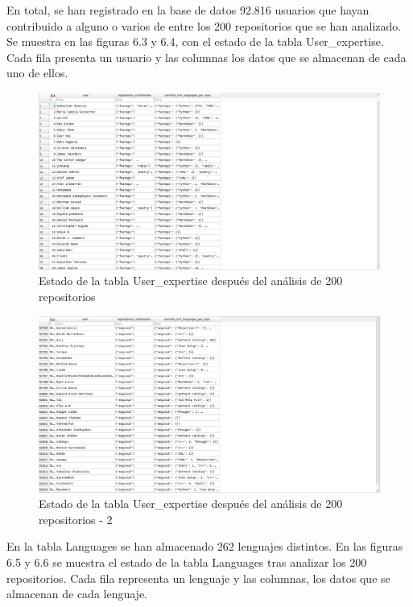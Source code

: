 \documentclass[a4paper, 12pt]{book}
\begin{document}
En total, se han registrado en la base de datos 92.816 usuarios que hayan contribuido a alguno o varios de entre los 200 repositorios que se han analizado. Se muestra en las figuras 6.3 y 6.4, con el estado de la tabla User\_expertise. Cada fila presenta un usuario y las columnas los datos que se almacenan de cada uno de ellos.

\begin{figure}[H]
  \centering
  \includegraphics[width=1\textwidth]{img/tablauserexp1.png}
  \caption{Estado de la tabla User\_expertise después del análisis de 200 repositorios}
  \label{figura:userexpafter1}
\end{figure}

\begin{figure}[H]
  \centering
  \includegraphics[width=1\textwidth]{img/tablauserexp2.png}
  \caption{Estado de la tabla User\_expertise después del análisis de 200 repositorios - 2}
  \label{figura:userexpafter2}
\end{figure}

En la tabla Languages se han almacenado 262 lenguajes distintos. En las figuras 6.5 y 6.6 se muestra el estado de la tabla Languages tras analizar los 200 repositorios. Cada fila representa un lenguaje y las columnas, los datos que se almacenan de cada lenguaje.
\end{document}
